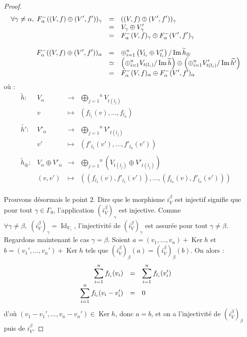 \documentclass[a4paper,10pt]{article}
\DeclareMathOperator{\Ker}{Ker}
\DeclareMathOperator{\Id}{Id}
\DeclareMathOperator{\Img}{Im}
\newcommand{\dps}{\displaystyle}
\begin{document}
\begin{proof}
\[
\begin{array}{>{\dps}r>{\dps}l>{\dps}l}
	\forall\gamma\neq\alpha,\;F_{\alpha}^{-}((V,f)\oplus(V',f'))_{\gamma}&=&((V,f)\oplus(V',f'))_{\gamma}\\
	&=& V_{\gamma}\oplus V_{\gamma}'\\
	&=&  F_{\alpha}^{-}(V,f)_{\gamma}\oplus F_{\alpha}^{-}(V',f')_{\gamma}\\
	&&\\
	F_{\alpha}^{-}((V,f)\oplus(V',f'))_{\alpha}&=&\oplus_{i=1}^{n}\left(V_{l_{i}} \oplus V'_{l_{i}}\right)/ \Img \widetilde{h}_{\oplus} \\
	&\simeq& \left( \oplus_{i=1}^{n}V_{t(l_{i})} / \Img \widetilde{h} \right) \oplus  \left( \oplus_{i=1}^{n}V'_{t(l_{i})} / \Img \widetilde{h'} \right)\\
	&=&  F_{\alpha}^{-}(V,f)_{\alpha}\oplus F_{\alpha}^{-}(V',f')_{\alpha}\\
\end{array}
\] 
où :
\[
\begin{array}{lccc}
	\widetilde{h} : & V_{\alpha} &\rightarrow & \overset{n}{\underset{j=1}{\bigoplus}}V_{t(l_{j})} \\ 
	& v&\mapsto & \left(f_{l_{1}}(v), \dots, f_{l_{n}}\right)\\
	&&&\\
	\widetilde{h'} : & V'_{\alpha} &\rightarrow & \overset{n}{\underset{j=1}{\bigoplus}}V'_{t(l_{j})} \\ 
	& v'&\mapsto & \left(f'_{l_{1}}(v'), \dots, f'_{l_{n}}(v')\right)\\
	&&&\\
	\widetilde{h}_{\oplus} : &V_{\alpha} \oplus V'_{\alpha} &\rightarrow & \overset{n}{\underset{j=1}{\bigoplus}}(V_{t(l_{j})} \oplus V'_{t(l_{j})}) \\ 
	& (v,v') &\mapsto & \left((f_{l_{1}}(v),f'_{l_{1}}(v')), \dots, (f_{l_{n}}(v),f'_{l_{n}}(v'))\right)\\
\end{array}
	\]


	Prouvons désormais le point $2$. Dire que le morphisme $i_{V}^{\beta}$ est injectif signifie que pour tout $\gamma\in\Gamma_{0}$, l'application $(i_{V}^{\beta})_{\gamma}$ est injective. Comme $\forall\gamma\neq\beta,\;(i_{V}^{\beta})_{\gamma}=\Id_{V_{\gamma}}$, l'injectivité de $(i_{V}^{\beta})_{\gamma}$ est assurée pour tout $\gamma\neq\beta$. Regardons maintenant le cas $\gamma=\beta$. Soient $a=(v_{1},\dots,v_{n})+\Ker h$ et $b=(v_{1}',\dots,v_{n}')+\Ker h$ tels que $(i_{V}^{\beta})_{\beta}(a)=(i_{V}^{\beta})_{\beta}(b)$. On alors :
	\[
\begin{array}{>{\dps}r>{\dps}l>{\dps}l}
	\sum_{i=1}^{n}f_{l_{i}}(v_{i})&=&\sum_{i=1}^{n}f_{l_{i}}(v'_{i})\\
	\sum_{i=1}^{n}f_{l_{i}}(v_{i}-v_{i}')&=&0
\end{array}
	\]
	d'où $(v_{1}-v_{1}',\dots,v_{n}-v_{n}')\in\Ker h$, donc $a=b$, et on a l'injectivité de $(i_{V}^{\beta})_{\beta}$ puis de $i_{V}^{\beta}$.



\end{proof}
\end{document}
